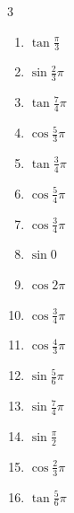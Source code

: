 \begin{multicols}{3}
\begin{enumerate}
  \item $\displaystyle \tan{\frac{\pi}{3}}$

  \item $\displaystyle \sin{\frac{2}{3}\pi}$

  \item $\displaystyle \tan{\frac{7}{4}\pi}$
        \phantom{$\displaystyle =-1$}

  \item $\displaystyle \cos{\frac{5}{3}\pi}$

  \item $\displaystyle \tan{\frac{3}{4}\pi}$
        \phantom{$\displaystyle =-1$}

  \item $\displaystyle \cos{\frac{5}{4}\pi}$

  \item $\displaystyle \cos{\frac{3}{4}\pi}$

  \item $\displaystyle \sin{0}$
        \phantom{$\displaystyle =0$}

  \item $\displaystyle \cos{2\pi}$
        \phantom{$\displaystyle =1$}

  \item $\displaystyle \cos{\frac{3}{4}\pi}$

  \item $\displaystyle \cos{\frac{4}{3}\pi}$

  \item $\displaystyle \sin{\frac{5}{6}\pi}$

  \item $\displaystyle \sin{\frac{7}{4}\pi}$

  \item $\displaystyle \sin{\frac{\pi}{2}}$
        \phantom{$\displaystyle =1$}

  \item $\displaystyle \cos{\frac{2}{3}\pi}$

  \item $\displaystyle \tan{\frac{5}{6}\pi}$


\end{enumerate}
\end{multicols}
